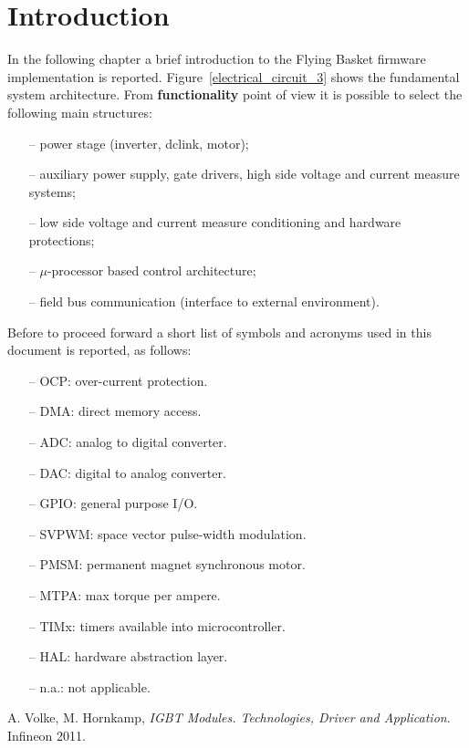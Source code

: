 \documentclass[11pt,a4paper]{article}
\title{\textbf{ 
		\begin{LARGE}
			DriverBoard Test Evaluation
		\end{LARGE} \\[24pt]
		\begin{Large}
			Preliminary wishes
	\end{Large}}
}
\author{Davide Bagnara, Gernot Landskron}
\numberwithin{equation}{section}
\theoremstyle{it}
\theoremstyle{definition}
\begin{document}
	\begin{onehalfspace}
		\thispagestyle{firstpage}
		\begin{mybox}
			\maketitle
			\vspace{110mm}
		\end{mybox}
		\newpage
		\tableofcontents
		\listoffigures	
		\listoftables
		\newpage
		
		\chapter{Introduction}	
		In the following chapter a brief introduction to the Flying Basket firmware implementation is reported. Figure~\ref{electrical_circuit_3} shows the fundamental system architecture. From \textbf{functionality} point of view it is possible to select the following main structures:
		\begin{itemize}
			\item[--] power stage (inverter, dclink, motor);
			\item[--] auxiliary power supply, gate drivers, high side voltage and current measure systems;
			\item[--] low side voltage and current measure conditioning and hardware protections;
			\item[--] $\mu$-processor based control architecture;
			\item[--] field bus communication (interface to external environment).
		\end{itemize} 
		Before to proceed forward a short list of symbols and acronyms used in this document is reported, as follows:
		\begin{itemize}
			\item[--] 	OCP: over-current protection.
			\item[--]	DMA: direct memory access.
			\item[--]   ADC: analog to digital converter.	
			\item[--] 	DAC: digital to analog converter.
			\item[--] 	GPIO: general purpose I/O.	
			\item[--] 	SVPWM: space vector pulse-width modulation.
			\item[--] 	PMSM: permanent magnet synchronous motor.	
			\item[--] 	MTPA: max torque per ampere.
			\item[--] 	TIMx: timers available into microcontroller.
			\item[--] 	HAL: hardware abstraction layer.
			\item[--] 	n.a.: not applicable.
		\end{itemize}

		
		\clearpage
		\begin{thebibliography}{99}
			A. Volke, M. Hornkamp, \emph{IGBT Modules. Technologies, Driver and Application}. Infineon 2011.			
		\end{thebibliography}
	\end{onehalfspace}
\end{document}
